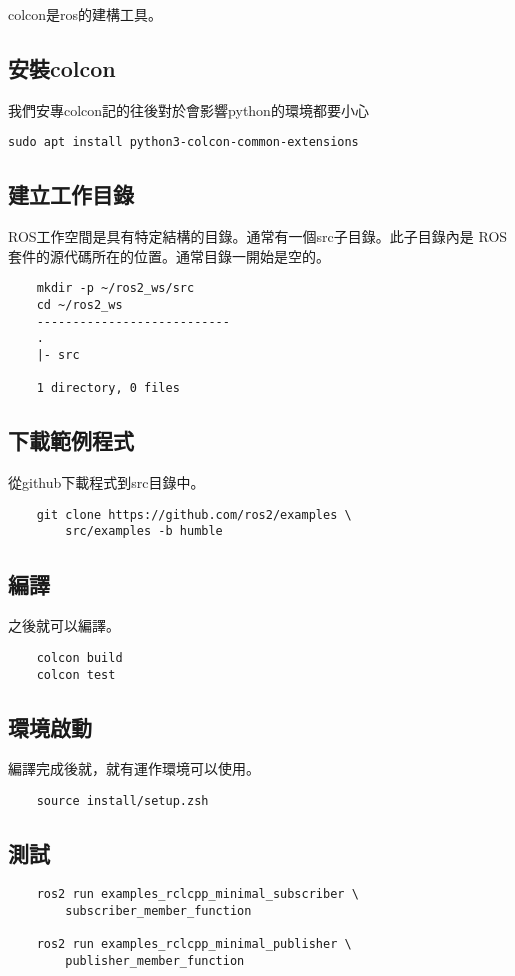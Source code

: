 colcon是ros的建構工具。
\subsection{安裝colcon}
我們安專colcon記的往後對於會影響python的環境都要小心
\begin{verbatim}
sudo apt install python3-colcon-common-extensions
\end{verbatim}

\subsection{建立工作目錄}
ROS工作空間是具有特定結構的目錄。通常有一個src子目錄。此子目錄內是 ROS 套件的源代碼所在的位置。通常目錄一開始是空的。

\begin{verbatim}
    mkdir -p ~/ros2_ws/src
    cd ~/ros2_ws
    ---------------------------
    .
    |- src

    1 directory, 0 files
\end{verbatim}
\subsection{下載範例程式}
從github下載程式到src目錄中。
\begin{verbatim}
    git clone https://github.com/ros2/examples \ 
        src/examples -b humble
\end{verbatim}
\subsection{編譯}
之後就可以編譯。
\begin{verbatim}
    colcon build
    colcon test
\end{verbatim}

\subsection{環境啟動}
編譯完成後就，就有運作環境可以使用。

\begin{verbatim}
    source install/setup.zsh
\end{verbatim}
\subsection{測試}
\begin{verbatim}
    ros2 run examples_rclcpp_minimal_subscriber \ 
        subscriber_member_function

    ros2 run examples_rclcpp_minimal_publisher \ 
        publisher_member_function
\end{verbatim}

